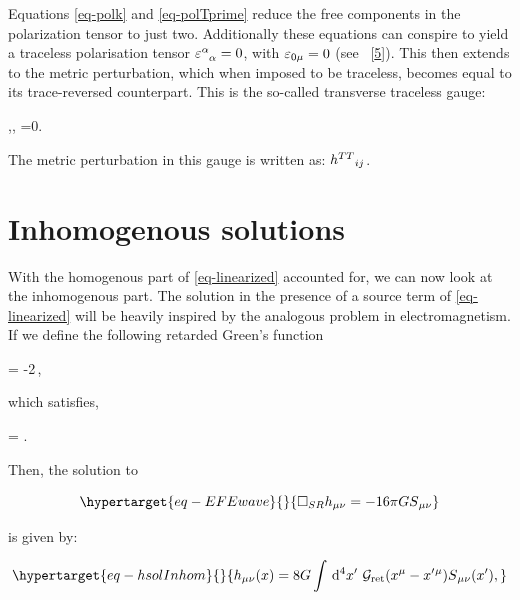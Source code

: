 \documentclass[
  10pt,
  a4paper,
  DIV=11,
  numbers=noendperiod,
  oneside]{scrreprt}
\let\[\relax \let\]\relax %
\DeclareRobustCommand{\[}{\begin{equation}}
\DeclareRobustCommand{\]}{\end{equation}}
\begin{document}
Equations \ref{eq-polk} and \ref{eq-polTprime} reduce the free
components in the polarization tensor to just two. Additionally these
equations can conspire to yield a traceless polarisation tensor
\(\trpol=0\), with \(\polco[0\mu]=0\) (see
~{[}\protect\hyperlink{ref-Carroll:2019}{5}{]}). This then extends to
the metric perturbation, which when imposed to be traceless, becomes
equal to its trace-reversed counterpart. This is the so-called
transverse traceless gauge:

\[
,\quad {}, \quad \ipdv[^]{\weakmet}{\nu}=0.
\]

The metric perturbation in this gauge is written as: \(\weakTTmet\).

\hypertarget{inhomogenous-solutions}{%
\section{Inhomogenous solutions}\label{inhomogenous-solutions}}

With the homogenous part of \ref{eq-linearized} accounted for, we can
now look at the inhomogenous part. The solution in the presence of a
source term of \ref{eq-linearized} will be heavily inspired by the
analogous problem in electromagnetism. If we define the following
retarded Green's function

\[
     = -2\pi\,,
\]

which satisfies,

\[
    \SRDA{} = .
\]

Then, the solution to

\begin{equation}\protect\hypertarget{eq-EFEwave}{}{
 \SRDA \weakmet =  -16 \pi \grav \srcco
}\label{eq-EFEwave}\end{equation}

is given by:

\begin{equation}\protect\hypertarget{eq-hsolInhom}{}{
    \weakmet(x) = 8G\int\dd[4]{x'}\,\greens{\ct{x}-\ct{x'}}\srcco(x'),
}\label{eq-hsolInhom}\end{equation}

\end{document}
